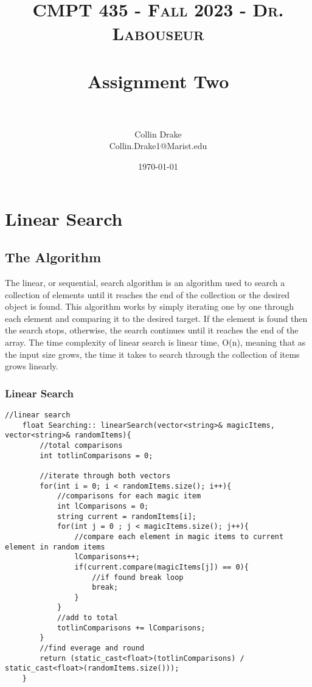 \documentclass[letterpaper, 10pt,DIV=13]{scrartcl}
\title{	
   \normalfont \normalsize 
   \textsc{CMPT 435 - Fall 2023 - Dr. Labouseur} \\[10pt] %
   \horrule{0.5pt} \\[0.25cm] 	%
   \huge Assignment Two  \\     	    %
   \horrule{0.5pt} \\[0.25cm] 	%
}
\author{Collin Drake \\ \normalsize Collin.Drake1@Marist.edu}
\date{\normalsize\today} 	%
\numberwithin{equation}{section} %
\numberwithin{figure}{section} %
\numberwithin{table}{section} %
\begin{document}
\maketitle %

\section{Linear Search}

\subsection{The Algorithm}
The linear, or sequential, search algorithm is an algorithm used to search a collection of elements until it reaches the end of the collection or the desired object is found. This algorithm works by simply iterating one by one through each element and comparing it to the desired target. If the element is found then the search stops, otherwise, the search continues until it reaches the end of the array. The time complexity of linear search is linear time, O(n), meaning that as the input size grows, the time it takes to search through the collection of items grows linearly.

\subsubsection*{Linear Search}
    \lstset{numbers=left, numberstyle=\tiny, stepnumber=1, numbersep=5pt, basicstyle=\footnotesize\ttfamily}
    \begin{lstlisting}[frame=single, ]
    //linear search
    float Searching:: linearSearch(vector<string>& magicItems, vector<string>& randomItems){
        //total comparisons
        int totlinComparisons = 0;
    
        //iterate through both vectors
        for(int i = 0; i < randomItems.size(); i++){
            //comparisons for each magic item
            int lComparisons = 0;
            string current = randomItems[i];
            for(int j = 0 ; j < magicItems.size(); j++){
                //compare each element in magic items to current element in random items
                lComparisons++;
                if(current.compare(magicItems[j]) == 0){
                    //if found break loop
                    break;
                }
            }
            //add to total
            totlinComparisons += lComparisons;
        }
        //find everage and round
        return (static_cast<float>(totlinComparisons) / static_cast<float>(randomItems.size()));
    }

\end{lstlisting}
\end{document}
